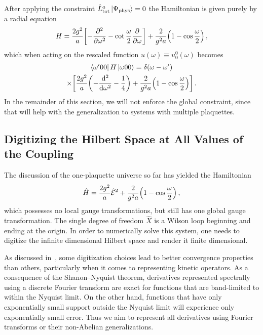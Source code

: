 \documentclass[reprint,superscriptaddress,pra,nofootinbib,preprintnumbers,floatfix]{revtex4-1}
\begin{document}
After applying the constraint $\hat{L}^a_\mathrm{tot} \ket{\Psi_\text{phys}} = 0$ the Hamiltonian is given purely by a radial equation
%
\begin{equation}
    H = \frac{2 g^2}{a}\bqty{-\pdv[2]{\omega} - \cot\frac{\omega}{2}\pdv{\omega}}
         + \frac{2}{g^2 a}\pqty{1 - \cos \frac{\omega}{2}} \,,
\end{equation}
which when acting on the rescaled function $u(\omega)\equiv u^0_0(\omega)$ becomes
\begin{multline}
    \bra{\omega'00} H \ket{\omega00} = \delta(\omega-\omega') \\
       \times \bqty{\frac{2g^2}{a}\pqty{-\dv[2]{\omega} - \frac{1}{4}}
                    + \frac{2}{g^2 a}\pqty{1 - \cos \frac{\omega}{2}} }\,.
\end{multline}
%
In the remainder of this section, we will not enforce the global constraint, since that will help with the generalization to systems with multiple plaquettes. 



\subsection{Digitizing the Hilbert Space at All Values of the Coupling}

The discussion of the one-plaquette universe so far has yielded the Hamiltonian
%
\begin{equation}\label{eq:one_plaq_ham}
    \hat{H} = \frac{2g^2}{a}\hat{\mathcal{E}}^2 + \frac{2}{g^2 a}\pqty{1 - \cos\frac{\omega}{2}} \,,
\end{equation}
%
which possesses no local gauge transformations, but still has one global gauge transformation.
%
The single degree of freedom $\hat{X}$ is a Wilson loop beginning and ending at the origin. 
%
In order to numerically solve this system, one needs to digitize the infinite dimensional Hilbert space and render it finite dimensional.



As discussed in~\cite{macridin:2018,macridin:2018.2,Klco:2019,Bauer:2021gek}, some digitization choices lead to better convergence properties than others, particularly when it comes to representing kinetic operators. 
%
As a consequence of the Shanon--Nyquist theorem, derivatives represented spectrally using a discrete Fourier transform are exact for functions that are band-limited to within the Nyquist limit. 
%
On the other hand, functions that have only exponentially small support outside the Nyquist limit will experience only exponentially small error. 
%
Thus we aim to represent all derivatives using Fourier transforms or their non-Abelian generalizations.
\end{document}
